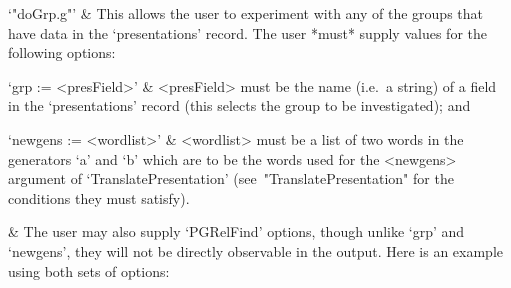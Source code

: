\beginitems

\quad`"doGrp.g"' &
This allows the user to experiment with any of the  groups  that  have
data in the `presentations' record. The user *must* supply values  for
the following options:

\qquad`grp := <presField>' &
<presField> must be the  name  (i.e.~a  string)  of  a  field  in  the
`presentations' record (this selects the group  to  be  investigated);
and

\qquad`newgens := <wordlist>' &
<wordlist> must be a list of two words in the generators `a'  and  `b'
which are  to  be  the  words  used  for  the  <newgens>  argument  of
`TranslatePresentation'    (see~"TranslatePresentation"    for     the
conditions they must satisfy).

&
The user may also supply `PGRelFind' options, though unlike `grp'  and
`newgens', they will not be directly observable in the output. Here is
an example using both sets of options:

